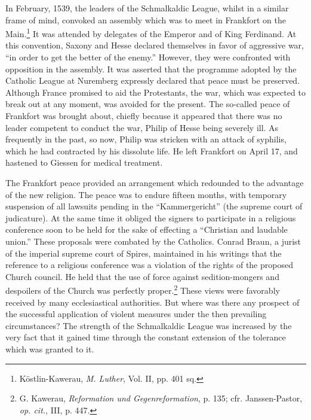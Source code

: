 In February, 1539, the leaders of the Schmalkaldic League, whilst
in a similar frame of mind, convoked an assembly which was to meet
in Frankfort on the Main.\footnote{Köstlin-Kawerau, \textit{M. Luther}, Vol. II, pp. 401 sq.}
 It was attended by delegates of the Emperor
and of King Ferdinand. At this convention, Saxony and Hesse
declared themselves in favor of aggressive war, “in order to get the
better of the enemy.” However, they were confronted with opposition in
the assembly. It was asserted that the programme adopted by
the Catholic League at Nuremberg expressly declared that peace must
be preserved. Although France promised to aid the Protestants, the
war, which was expected to break out at any moment, was avoided
for the present. The so-called peace of Frankfort was brought about,
chiefly because it appeared that there was no leader competent to conduct
the war, Philip of Hesse being severely ill. As frequently in the
past, so now, Philip was stricken with an attack of syphilis, which
he had contracted by his dissolute life. He left Frankfort on April 17,
and hastened to Giessen for medical treatment.

The Frankfort peace provided an arrangement which redounded
to the advantage of the new religion. The peace was to endure fifteen
months, with temporary suspension of all lawsuits pending in
the “Kammergericht” (the supreme court of judicature). At the
same time it obliged the signers to participate in a religious conference
soon to be held for the sake of effecting a “Christian and laudable
union.” These proposals were combated by the Catholics. Conrad
Braun, a jurist of the imperial supreme court of Spires, maintained
in his writings that the reference to a religious conference was a violation
of the rights of the proposed Church council. He held that the
use of force against sedition-mongers and despoilers of the Church
was perfectly proper.\footnote{G. Kawerau, \textit{Reformation und Gegenreformation}, p. 135; cfr. Janssen-Pastor, \textit{op. cit.},
III, p. 447.}
 These views were favorably received by many
ecclesiastical authorities. But where was there any prospect of the successful
application of violent measures under the then prevailing circumstances?
The strength of the Schmalkaldic League was increased
by the very fact that it gained time through the constant extension of
the tolerance which was granted to it.

